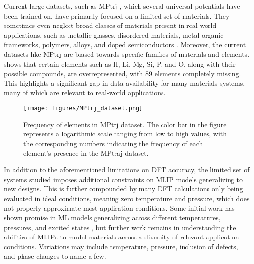 Current large datasets, such as MPtrj \citep{deng2023chgnet}, which several universal potentials have been trained on, have primarily focused on a limited set of materials. They sometimes even neglect broad classes of materials present in real-world applications, such as metallic glasses, disordered materials, metal organic frameworks, polymers, alloys, and doped semiconductors \citep{burner2023arc, wang2024perovs, vita2023colabfit, downs2003american}. Moreover, the current datasets like MPtrj are biased towards specific families of materials and elements.  shows that certain elements such as H, Li, Mg, Si, P, and O, along with their possible compounds, are overrepresented, with 89 elements completely missing. This highlights a significant gap in data availability for many materials systems, many of which are relevant to real-world applications. 

\begin{figure}[h]
    \vspace{-0.35cm}
    \centering
    \texttt{[image: figures/MPtrj\_dataset.png]}
    \vspace{-0.35cm}
    \caption{Frequency of elements in MPtrj dataset. The color bar in the figure represents a logarithmic scale ranging from low to high values, with the corresponding numbers indicating the frequency of each element's presence in the MPtraj dataset.}
    \label{fig:mptrj-data}
    \vspace{-0.35cm}
\end{figure}

In addition to the aforementioned limitations on DFT accuracy, the limited set of systems studied imposes additional constraints on MLIP models generalizing to new designs. This is further compounded by many DFT calculations only being evaluated in ideal conditions, meaning zero temperature and pressure, which does not properly approximate most application conditions. Some initial work has shown promise in ML models generalizing across different temperatures, pressures, and excited states \citep{merchant2023scaling, batatia2023foundation, westermayr2020machine}, but further work remains in understanding the abilities of MLIPs to model materials across a diversity of relevant application conditions. Variations may include temperature, pressure, inclusion of defects, and phase changes to name a few.


